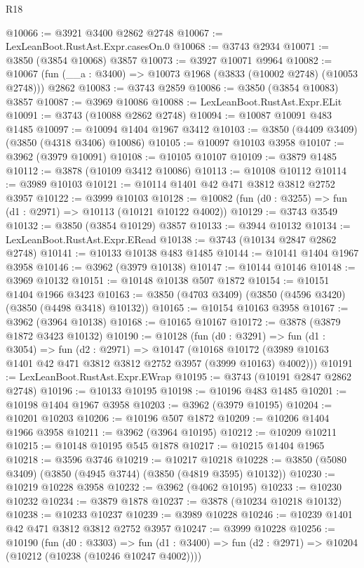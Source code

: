 \begin{lexlean}{R18}
\begin{coremodule}
@10066 := @3921 @3400 @2862 @2748
@10067 := LexLeanBoot.RustAst.Expr.casesOn.{0}
@10068 := @3743 @2934
@10071 := @3850 (@3854 @10068) @3857
@10073 := @3927 @10071 @9964
@10082 := @10067 (fun (__a : @3400) => @10073 @1968 (@3833 (@10002 @2748) (@10053 @2748))) @2862
@10083 := @3743 @2859
@10086 := @3850 (@3854 @10083) @3857
@10087 := @3969 @10086
@10088 := LexLeanBoot.RustAst.Expr.ELit
@10091 := @3743 (@10088 @2862 @2748)
@10094 := @10087 @10091 @483 @1485
@10097 := @10094 @1404 @1967 @3412
@10103 := @3850 (@4409 @3409) (@3850 (@4318 @3406) @10086)
@10105 := @10097 @10103 @3958
@10107 := @3962 (@3979 @10091)
@10108 := @10105 @10107
@10109 := @3879 @1485
@10112 := @3878 (@10109 @3412 @10086)
@10113 := @10108 @10112
@10114 := @3989 @10103
@10121 := @10114 @1401 @42 @471 @3812 @3812 @2752 @3957
@10122 := @3999 @10103
@10128 := @10082 (fun (d0 : @3255) => fun (d1 : @2971) => @10113 (@10121 @10122 @4002))
@10129 := @3743 @3549
@10132 := @3850 (@3854 @10129) @3857
@10133 := @3944 @10132
@10134 := LexLeanBoot.RustAst.Expr.ERead
@10138 := @3743 (@10134 @2847 @2862 @2748)
@10141 := @10133 @10138 @483 @1485
@10144 := @10141 @1404 @1967 @3958
@10146 := @3962 (@3979 @10138)
@10147 := @10144 @10146
@10148 := @3969 @10132
@10151 := @10148 @10138 @507 @1872
@10154 := @10151 @1404 @1966 @3423
@10163 := @3850 (@4703 @3409) (@3850 (@4596 @3420) (@3850 (@4498 @3418) @10132))
@10165 := @10154 @10163 @3958
@10167 := @3962 (@3964 @10138)
@10168 := @10165 @10167
@10172 := @3878 (@3879 @1872 @3423 @10132)
@10190 := @10128
    (fun (d0 : @3291) =>
    fun (d1 : @3054) =>
    fun (d2 : @2971) =>
    @10147
      (@10168 @10172 (@3989 @10163 @1401 @42 @471 @3812 @3812 @2752 @3957 (@3999 @10163) @4002)))
@10191 := LexLeanBoot.RustAst.Expr.EWrap
@10195 := @3743 (@10191 @2847 @2862 @2748)
@10196 := @10133 @10195
@10198 := @10196 @483 @1485
@10201 := @10198 @1404 @1967 @3958
@10203 := @3962 (@3979 @10195)
@10204 := @10201 @10203
@10206 := @10196 @507 @1872
@10209 := @10206 @1404 @1966 @3958
@10211 := @3962 (@3964 @10195)
@10212 := @10209 @10211
@10215 := @10148 @10195 @545 @1878
@10217 := @10215 @1404 @1965
@10218 := @3596 @3746
@10219 := @10217 @10218
@10228 := @3850 (@5080 @3409) (@3850 (@4945 @3744) (@3850 (@4819 @3595) @10132))
@10230 := @10219 @10228 @3958
@10232 := @3962 (@4062 @10195)
@10233 := @10230 @10232
@10234 := @3879 @1878
@10237 := @3878 (@10234 @10218 @10132)
@10238 := @10233 @10237
@10239 := @3989 @10228
@10246 := @10239 @1401 @42 @471 @3812 @3812 @2752 @3957
@10247 := @3999 @10228
@10256 := @10190
    (fun (d0 : @3303) =>
    fun (d1 : @3400) => fun (d2 : @2971) => @10204 (@10212 (@10238 (@10246 @10247 @4002))))

\end{coremodule}
\end{lexlean}
